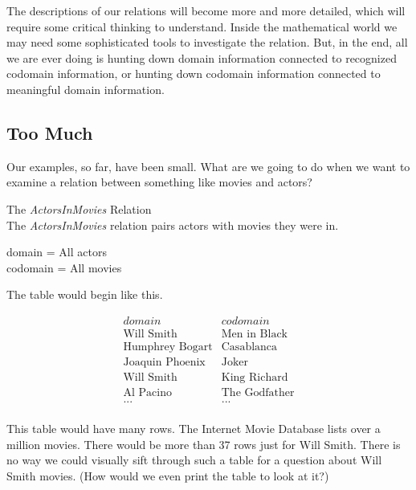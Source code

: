 \documentclass{ximera}
\begin{document}
The descriptions of our relations will become more and more detailed, which will require some critical thinking to understand. Inside the mathematical world we may need some sophisticated tools to investigate the relation.  But, in the end, all we are ever doing is hunting down domain information connected to recognized codomain information, or hunting down codomain information connected to meaningful domain information. \\












\subsection*{Too Much}

Our examples, so far, have been small.  What are we going to do when we want to examine a relation between something like movies and actors?  


\begin{example} The \textit{ActorsInMovies} Relation\\
The \textit{ActorsInMovies} relation pairs actors with movies they were in.

domain = All actors \\
codomain = All movies

The table would begin like this.

\[
\begin{array}{l|l}
    domain      & codomain      \\ \hline
    \text{Will Smith}   &  \text{Men in Black} \\
    \text{Humphrey Bogart}   & \text{Casablanca} \\
    \text{Joaquin Phoenix}  &  \text{Joker} \\
    \text{Will Smith}  &  \text{King Richard} \\
    \text{Al Pacino} &  \text{The Godfather} \\ 
    \text{...} &  \text{...} \\ 
\end{array}
\]

\end{example} 


This table would have many rows. The Internet Movie Database lists over a million movies.  There would be more than 37 rows just for Will Smith. There is no way we could visually sift through such a table for a question about Will Smith movies. (How would we even print the table to look at it?)
\end{document}
